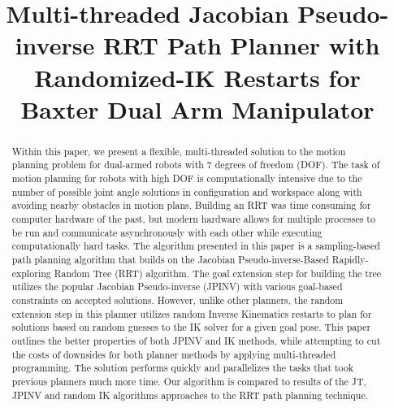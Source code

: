 \documentclass[conference]{IEEEtran} \usepackage[T1]{fontenc} \usepackage[backend=biber, style=ieee]{biblatex}
\begin{document}
\title{Multi-threaded Jacobian Pseudo-inverse RRT Path Planner with Randomized-IK Restarts for Baxter Dual Arm Manipulator}

\author{
}

\maketitle

\begin{abstract}
Within this paper, we present a flexible, multi-threaded solution to the motion planning problem for dual-armed robots with 7 degrees of freedom (DOF). The task of motion 
planning for robots with high DOF is computationally intensive due to the number of possible joint angle solutions in configuration and workspace along with avoiding nearby 
obstacles in motion plans. Building an RRT was time consuming for computer hardware of the past, but modern hardware allows for multiple processes to be run and communicate 
asynchronously with each other while executing computationally hard tasks. The algorithm presented in this paper is a sampling-based path planning algorithm that builds on the 
Jacobian Pseudo-inverse-Based Rapidly-exploring Random Tree (RRT) algorithm. The goal extension step for building the tree utilizes the popular Jacobian Pseudo-inverse (JPINV)
with various goal-based constraints on accepted solutions. However, unlike other planners, the random extension step in this planner utilizes random Inverse Kinematics 
restarts to plan for solutions based on random guesses to the IK solver for a given goal pose. This paper outlines the better properties of both JPINV and IK methods, while 
attempting to cut the costs of downsides for both planner methods by applying multi-threaded programming. The solution performs quickly and parallelizes the tasks that took
previous planners much more time. Our algorithm is compared to results of the JT, JPINV and random IK algorithms approaches to the RRT path planning technique.
\end{abstract}
\end{document}

